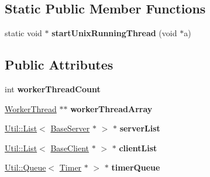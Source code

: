 \subsection*{Static Public Member Functions}
\begin{DoxyCompactItemize}
\item 
\mbox{\label{class_c_g_1_1_network_aad38df455a3c12db45492a1a1487ca87}} 
static void $\ast$ {\bfseries start\+Unix\+Running\+Thread} (void $\ast$a)
\end{DoxyCompactItemize}
\subsection*{Public Attributes}
\begin{DoxyCompactItemize}
\item 
\mbox{\label{class_c_g_1_1_network_a6130f231ce02cf35083675b1f08d941d}} 
int {\bfseries worker\+Thread\+Count}
\item 
\mbox{\label{class_c_g_1_1_network_a7bbcc20e73d8ffd3cc5c1e9b5ca45653}} 
\mbox{\hyperlink{class_c_g_1_1_worker_thread}{Worker\+Thread}} $\ast$$\ast$ {\bfseries worker\+Thread\+Array}
\item 
\mbox{\label{class_c_g_1_1_network_a12e773c9b3a524ba449baaae26465578}} 
\mbox{\hyperlink{class_util_1_1_list}{Util\+::\+List}}$<$ \mbox{\hyperlink{class_c_g_1_1_base_server}{Base\+Server}} $\ast$ $>$ $\ast$ {\bfseries server\+List}
\item 
\mbox{\label{class_c_g_1_1_network_accc7187702968499740a9de2dca33d32}} 
\mbox{\hyperlink{class_util_1_1_list}{Util\+::\+List}}$<$ \mbox{\hyperlink{class_c_g_1_1_base_client}{Base\+Client}} $\ast$ $>$ $\ast$ {\bfseries client\+List}
\item 
\mbox{\label{class_c_g_1_1_network_a00a784ea618276fe54ab09dd4f57a301}} 
\mbox{\hyperlink{class_util_1_1_queue}{Util\+::\+Queue}}$<$ \mbox{\hyperlink{class_c_g_1_1_timer}{Timer}} $\ast$ $>$ $\ast$ {\bfseries timer\+Queue}
\item 
\mbox{\label{class_c_g_1_1_network_a0c66272858b3eb446fe80a0810dd7b8c}} 
$$
\end{DoxyCompactItemize}
